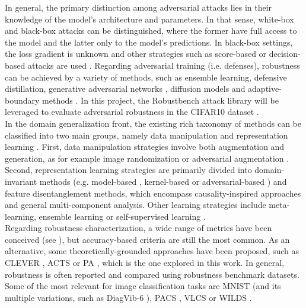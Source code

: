 In general, the primary distinction among adversarial attacks lies in
their knowledge of the model's architecture and parameters. In that
sense, white-box and black-box
attacks can be distinguished, where the former have full 
access to the model and the latter only 
to the model's predictions. In black-box settings, the loss gradient
is unknown and other strategies such as score-based or
decision-based attacks are used
\cite{liReviewAdversarialAttack2022}. Regarding adversarial training (i.e. defenses), 
robustness can
be achieved by a variety of methods, 
such as ensemble learning,
defensive distillation,
generative adversarial networks
\cite{xiaoGeneratingAdversarialExamples2019, miyatoVirtualAdversarialTraining2018},
diffusion models
\cite{wangBetterDiffusionModels2023,hoDenoisingDiffusionProbabilistic2020}
and adaptive-boundary methods
\cite{cohenCertifiedAdversarialRobustness2019}.
In this project, the Robustbench attack library
\cite{croceRobustBenchStandardizedAdversarial2021a}
will be leveraged to evaluate adversarial robustness 
in the CIFAR10 dataset
\cite{krizhevskyLearningMultipleLayers}. \\

In the domain generalization front, the existing rich taxonomy 
of methods can be classified into two main groups, namely
data manipulation and representation learning 
\cite{wangGeneralizingUnseenDomains2022,zhouDomainGeneralizationSurvey2022,liuOutOfDistributionGeneralizationSurvey2023}.
First, data manipulation strategies involve both augmentation and generation,
as for example image randomization or adversarial augmentation
\cite{yaoImprovingOutofDistributionRobustness2022,zhangMixupEmpiricalRisk2018,yunCutMixRegularizationStrategy2019}.
Second, representation learning strategies are primarily divided 
into domain-invariant methods (e.g. model-based
\cite{arjovskyInvariantRiskMinimization2020},
kernel-based
\cite{muandetDomainGeneralizationInvariant2013,arjovskyWassersteinGAN2017}
or adversarial-based
\cite{peiMultiAdversarialDomainAdaptation}) 
and feature disentanglement methods, which encompass causality-inspired
approaches and general multi-component analysis. Other 
learning strategies include meta-learning,
ensemble learning or self-supervised learning
\cite{liLearningGeneralizeMetaLearning2018,wangMetaFineTuningNeural2020}. \\

Regarding robustness characterization, a wide range of metrics
have been conceived (see
\cite{guoComprehensiveEvaluationFramework2023}), but
accuracy-based criteria are still the most common. As an alternative, 
some  theoretically-grounded approaches have been proposed, such
as CLEVER \cite{wengEvaluatingRobustnessNeural2018}, ACTS 
\cite{wangGeometricalApproachEvaluate2023}
or
PA
\cite{buhmannPosteriorAgreementModel2022}, 
which is the one explored in this work. 
In general, robustness is often reported and compared using 
robustness benchmark datasets. Some of the most relevant
for image classification tasks are 
MNIST 
\cite{lecun1998mnist}
(and its multiple variations, such as DiagVib-6
\cite{euligDiagViB6DiagnosticBenchmark2021}),
PACS
\cite{yuPACSDatasetPhysical2022},
VLCS
\cite{khoslaUndoingDamageDataset2012}
or WILDS
\cite{kohWILDSBenchmarkIntheWild2021}.

